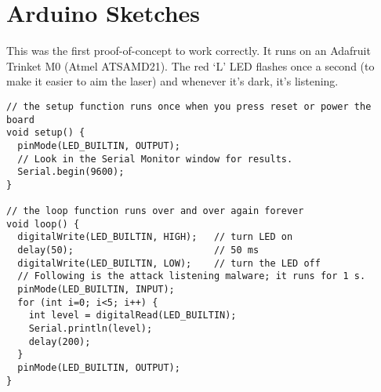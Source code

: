 \documentclass[a4paper,notitlepage]{article}
\begin{document}
\section{Arduino Sketches}
This was the first proof-of-concept to work correctly. It runs on an Adafruit
Trinket M0 (Atmel ATSAMD21). The red `L' LED flashes once a second (to make it
easier to aim the laser) and whenever it's dark, it's listening.
\begin{verbatim}
// the setup function runs once when you press reset or power the board
void setup() {
  pinMode(LED_BUILTIN, OUTPUT);
  // Look in the Serial Monitor window for results.
  Serial.begin(9600);
}

// the loop function runs over and over again forever
void loop() {
  digitalWrite(LED_BUILTIN, HIGH);   // turn LED on
  delay(50);                         // 50 ms
  digitalWrite(LED_BUILTIN, LOW);    // turn the LED off
  // Following is the attack listening malware; it runs for 1 s.
  pinMode(LED_BUILTIN, INPUT);
  for (int i=0; i<5; i++) {
    int level = digitalRead(LED_BUILTIN);
    Serial.println(level);
    delay(200);
  }
  pinMode(LED_BUILTIN, OUTPUT);
}
\end{verbatim}
\end{document}
